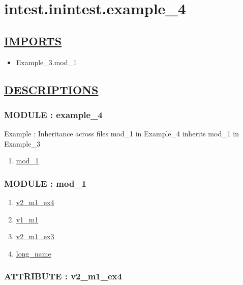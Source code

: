 \chapter*{intest.inintest.example\_4}

\section*{\underline{IMPORTS}}
\begin{itemize}
\item Example\_3.mod\_1
\end{itemize}

\section*{\underline{DESCRIPTIONS}}
\subsection*{MODULE : example\_4}
\hypertarget{ecldoc:intest.inintest.example_4_intest.inintest.example_4}{}
Example : Inheritance across files mod\_1 in Example\_4 inherits mod\_1 in Example\_3 \\
\begin{enumerate}
\item \hyperlink{ecldoc:intest.inintest.example_4_intest.inintest.example_4.mod_1}{mod\_1}
\end{enumerate}
\subsection*{MODULE : mod\_1}
\hypertarget{ecldoc:intest.inintest.example_4_intest.inintest.example_4.mod_1}{}
\begin{enumerate}
\item \hyperlink{ecldoc:intest.inintest.example_4_intest.inintest.example_4.mod_1.v2_m1_ex4}{v2\_m1\_ex4}
\item \hyperlink{ecldoc:intest.inintest.example_4_example_3.mod_1.v1_m1}{v1\_m1}
\item \hyperlink{ecldoc:intest.inintest.example_4_example_3.mod_1.v2_m1_ex3}{v2\_m1\_ex3}
\item \hyperlink{ecldoc:intest.inintest.example_4_example_3.mod_1.long_name}{long\_name}
\end{enumerate}
\subsection*{ATTRIBUTE : v2\_m1\_ex4}
\hypertarget{ecldoc:intest.inintest.example_4_intest.inintest.example_4.mod_1.v2_m1_ex4}{}
